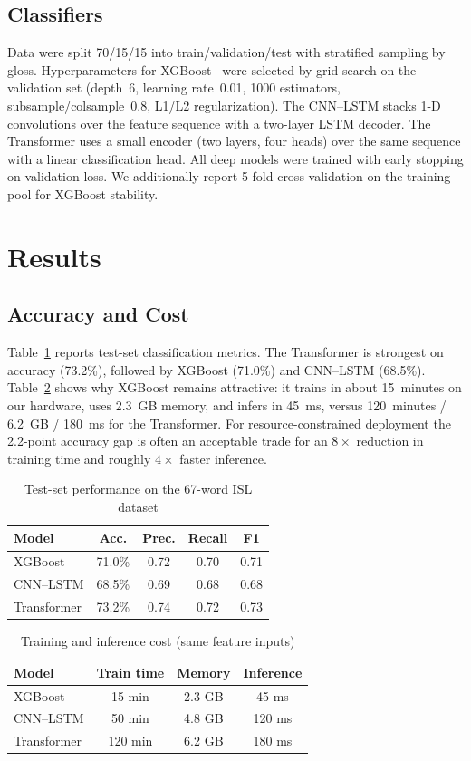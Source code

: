 \documentclass[conference]{IEEEtran}
\begin{document}
\subsection{Classifiers}
Data were split 70/15/15 into train/validation/test with stratified sampling by gloss. Hyperparameters for XGBoost~\cite{chen2016} were selected by grid search on the validation set (depth~6, learning rate~0.01, 1000 estimators, subsample/colsample~0.8, L1/L2 regularization). The CNN--LSTM stacks 1-D convolutions over the feature sequence with a two-layer LSTM decoder. The Transformer uses a small encoder (two layers, four heads) over the same sequence with a linear classification head. All deep models were trained with early stopping on validation loss. We additionally report 5-fold cross-validation on the training pool for XGBoost stability.

\section{Results}
\subsection{Accuracy and Cost}
Table~\ref{tab:acc} reports test-set classification metrics. The Transformer is strongest on accuracy (73.2\%), followed by XGBoost (71.0\%) and CNN--LSTM (68.5\%). Table~\ref{tab:compute} shows why XGBoost remains attractive: it trains in about 15~minutes on our hardware, uses 2.3~GB memory, and infers in 45~ms, versus 120~minutes / 6.2~GB / 180~ms for the Transformer. For resource-constrained deployment the 2.2-point accuracy gap is often an acceptable trade for an $8\times$ reduction in training time and roughly $4\times$ faster inference.

\begin{table}[t]
\centering
\caption{Test-set performance on the 67-word ISL dataset}
\label{tab:acc}
\begin{tabular}{@{}lcccc@{}}
\toprule
Model & Acc. & Prec. & Recall & F1 \\
\midrule
XGBoost & 71.0\% & 0.72 & 0.70 & 0.71 \\
CNN--LSTM & 68.5\% & 0.69 & 0.68 & 0.68 \\
Transformer & 73.2\% & 0.74 & 0.72 & 0.73 \\
\bottomrule
\end{tabular}
\end{table}

\begin{table}[t]
\centering
\caption{Training and inference cost (same feature inputs)}
\label{tab:compute}
\begin{tabular}{@{}lccc@{}}
\toprule
Model & Train time & Memory & Inference \\
\midrule
XGBoost & 15 min & 2.3 GB & 45 ms \\
CNN--LSTM & 50 min & 4.8 GB & 120 ms \\
Transformer & 120 min & 6.2 GB & 180 ms \\
\bottomrule
\end{tabular}
\end{table}
\end{document}
